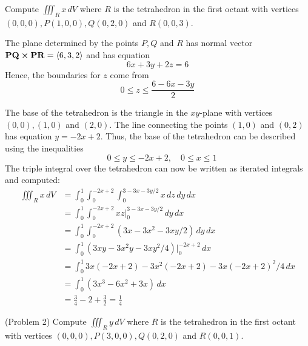 \documentclass[handout]{ximera}
\begin{document}
\begin{example}[Example 2]
Compute $\iiint_R x \, dV$ where $R$ is the tetrahedron in the first octant with 
vertices $(0,0,0), P(1, 0, 0), Q(0, 2, 0)$ and $R(0,0,3)$.


The plane determined by the points $P, Q$ and $R$ has normal vector $\mathbf{PQ} \boldsymbol\times \mathbf{PR} = \left\langle 6, 3, 2\right\rangle$
and has equation 
\[
6x + 3y + 2z = 6
\]
Hence, the boundaries for $z$ come from
\[
0 \leq z \leq \frac{6 - 6x - 3y}{2}
\]

The base of the tetrahedron is the triangle in the $xy$-plane with vertices $(0,0), (1,0)$ and $(2,0)$. 
The line connecting the points $(1,0)$ and $(0,2)$ has equation $y = -2x + 2$.
Thus, the base of the tetrahedron can be described using the inequalities
\[
\quad 0 \leq y \leq -2x+2, \quad 0 \leq x \leq 1
\]
The triple integral over the tetrahedron can now be written as iterated integrals and computed:
\begin{align*}
\iiint_R x \, dV & = \int_0^1 \int_0^{-2x+2} \int_0^{3 - 3x - 3y/2} x \, dz\, dy \, dx\\
                 & = \int_0^1 \int_0^{-2x+2}  xz\bigg|_0^{3 - 3x - 3y/2} \, dy \, dx\\
                 & = \int_0^1 \int_0^{-2x+2}  (3x - 3x^2 - 3xy/2) \, dy \, dx\\
                 &= \int_0^1   (3xy - 3x^2y - 3xy^2/4)\bigg|_0^{-2x+2} \, dx\\
                 &= \int_0^1 3x(-2x+2) -3x^2(-2x+2) -3x(-2x+2)^2/4 \, dx\\
                 &= \int_0^1   (3x^3 - 6x^2  +  3x)   \, dx\\
                 &= \frac34 - 2 + \frac32 = \frac14
\end{align*}  

\end{example}

\begin{problem}(Problem 2)
Compute $\iiint_R y \, dV$ where $R$ is the tetrahedron in the first octant with 
vertices $(0,0,0), P(3, 0, 0), Q(0, 2, 0)$ and $R(0,0,1)$.\\
\end{problem}
\end{document}
